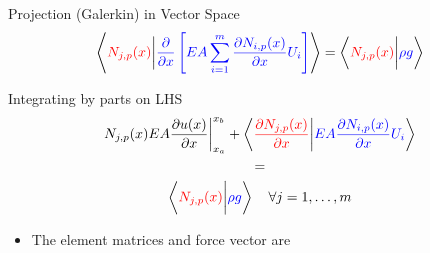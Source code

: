 \documentclass{beamer}
\newcommand{\pd}[2]{\frac{\partial #1}{\partial #2}}
\begin{document}
\begin{frame}[allowframebreaks]
  \begin{block}{Projection (Galerkin) in Vector Space}
    \begin{equation}\nonumber
      \left\langle  {\color{red}{N_{j,p}(x)}} \bigg\vert {\color{blue}{\pd{}{x} \left[ EA \sum_{i=1}^{m} \pd{N_{i,p}(x)}{x}  U_i  \right]}} \right\rangle  =
      \left\langle  {\color{red}{N_{j,p}(x)}} \bigg\vert {\color{blue}{\rho g}} \right\rangle 
    \end{equation}
  \end{block}
  \begin{block}{Integrating by parts on LHS}
    \begin{equation}\nonumber
      \begin{gathered}
        {{N_{j,p}(x) EA \pd{u(x)}{x}}}  \bigg\vert_{x_a}^{x_b} +  \left\langle {\color{red}{\pd{N_{j,p}(x)}{x}}}  \bigg\vert  {\color{blue}{EA  \pd{N_{i,p}(x)}{x}  U_i}}   \right\rangle \\
        = \\
        \left\langle {\color{red}{N_{j,p}(x)}} \bigg\vert {\color{blue}{\rho g}} \right\rangle \quad \forall j = 1, \ldots,m
      \end{gathered}
    \end{equation}
  \end{block}

  \begin{itemize}
    \item The element matrices and force vector are


\end{itemize}
\end{frame}
\end{document}
